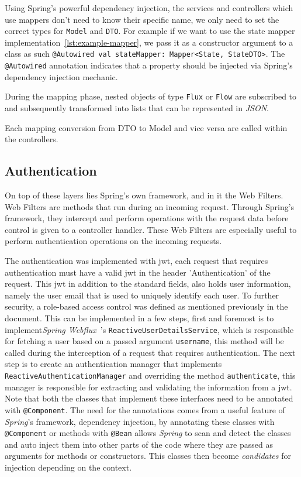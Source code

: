 Using Spring's powerful dependency injection, the services and controllers which use mappers don't need to know their specific name, we only need to set the correct types for \lstinline{Model} and \lstinline{DTO}. For example if we want to use the state mapper implementation~\ref{lst:example-mapper}, we pass it as a constructor argument to a class as such \lstinline{@Autowired val stateMapper: Mapper<State, StateDTO>}. The \lstinline{@Autowired} annotation indicates that a property should be injected via Spring's dependency injection mechanic.

During the mapping phase, nested objects of type \lstinline{Flux} or \lstinline{Flow} are subscribed to and subsequently transformed into lists that can be represented in \textit{JSON}.

Each mapping conversion from DTO to Model and vice versa are called within the controllers.


\subsection{Authentication}\label{ch:impl:sec:be:subsec:authentication}

On top of these layers lies Spring's own framework, and in it the Web Filters. Web Filters are methods that run during an incoming request. Through Spring's framework, they intercept and perform operations with the request data before control is given to a controller handler. 
These Web Filters are especially useful to perform authentication operations on the incoming requests.


The authentication was implemented with \acrfull{jwt}, each request that requires authentication must have a valid \acrshort{jwt} in the header 'Authentication' of the request. This \acrshort{jwt} in addition to the standard fields, also holds user information, namely the user email that is used to uniquely identify each user. 
To further security, a role-based access control was defined as mentioned previously in the document. This can be implemented in a few steps, first and foremost is to implement\textit{Spring Webflux}~\cite{spring-webflux}'s \lstinline{ReactiveUserDetailsService}, which is responsible for fetching a user based on a passed argument \lstinline{username}, this method will be called during the interception of a request that requires authentication. The next step is to create an authentication manager that implements \lstinline{ReactiveAuthenticationManager} and overriding the method \lstinline{authenticate}, this manager is responsible for extracting and validating the information from a \acrshort{jwt}. Note that both the classes that implement these interfaces need to be annotated with \lstinline{@Component}. The need for the annotations comes from a useful feature of \textit{Spring}'s framework, dependency injection, by annotating these classes with \lstinline{@Component} or methods with \lstinline{@Bean} allows \textit{Spring} to scan and detect the classes and auto inject them into other parts of the code where they are passed as arguments for methods or constructors. This classes then become \textit{candidates} for injection depending on the context. 

